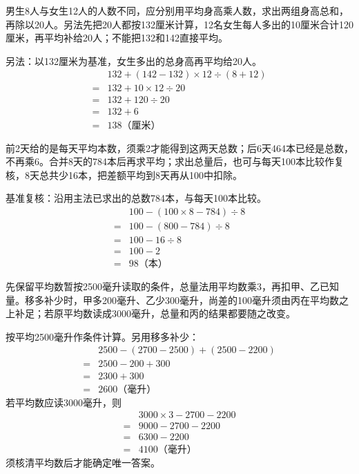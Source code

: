 \documentclass[multi=snippet,border=0pt]{standalone}
\newenvironment{snippet}[3]{\begin{minipage}{#1bp}\color{answerred}\fontsize{#2}{#3}\selectfont\raggedright}{\end{minipage}}
\begin{document}
\begin{snippet}{505}{11.5}{14}男生8人与女生12人的人数不同，应分别用平均身高乘人数，求出两组身高总和，再除以20人。另法先把20人都按132厘米计算，12名女生每人多出的10厘米合计120厘米，再平均补给20人；不能把132和142直接平均。\par 另法：以132厘米为基准，女生多出的总身高再平均给20人。\[\begin{aligned} &132+(142-132)\times12\div(8+12)\\={}&132+10\times12\div20\\={}&132+120\div20\\={}&132+6\\={}&138\text{（厘米）}\end{aligned}\]\end{snippet}
\begin{snippet}{505}{11.5}{14}前2天给的是每天平均本数，须乘2才能得到这两天总数；后6天464本已经是总数，不再乘6。合并8天的784本后再求平均；求出总量后，也可与每天100本比较作复核，8天总共少16本，把差额平均到8天再从100中扣除。\par 基准复核：沿用主法已求出的总数784本，与每天100本比较。\[\begin{aligned}&100-(100\times8-784)\div8\\={}&100-(800-784)\div8\\={}&100-16\div8\\={}&100-2\\={}&98\text{（本）}\end{aligned}\]\end{snippet}
\begin{snippet}{505}{11.5}{14}先保留平均数暂按2500毫升读取的条件，总量法用平均数乘3，再扣甲、乙已知量。移多补少时，甲多200毫升、乙少300毫升，尚差的100毫升须由丙在平均数之上补足；若原平均数读成3000毫升，总量和丙的结果都要随之改变。\par 按平均2500毫升作条件计算。另用移多补少：\[\begin{aligned}&2500-(2700-2500)+(2500-2200)\\={}&2500-200+300\\={}&2300+300\\={}&2600\text{（毫升）}\end{aligned}\]若平均数应读3000毫升，则\[\begin{aligned}&3000\times3-2700-2200\\={}&9000-2700-2200\\={}&6300-2200\\={}&4100\text{（毫升）}\end{aligned}\]须核清平均数后才能确定唯一答案。\end{snippet}
\end{document}
